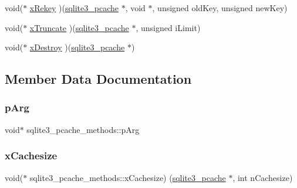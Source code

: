 \begin{DoxyCompactItemize}
void($\ast$ \mbox{\hyperlink{structsqlite3__pcache__methods_a0d8a7a980e22e908429a181f8fc7733e}{x\+Rekey}} )(\mbox{\hyperlink{sqlite3_8h_a096c453d937d51f7926d7d31c8e0bd2f}{sqlite3\+\_\+pcache}} $\ast$, void $\ast$, unsigned old\+Key, unsigned new\+Key)
\item 
void($\ast$ \mbox{\hyperlink{structsqlite3__pcache__methods_adc097defb1e83c6442fc0d47ac79cec9}{x\+Truncate}} )(\mbox{\hyperlink{sqlite3_8h_a096c453d937d51f7926d7d31c8e0bd2f}{sqlite3\+\_\+pcache}} $\ast$, unsigned i\+Limit)
\item 
void($\ast$ \mbox{\hyperlink{structsqlite3__pcache__methods_ac775533f86db1d15bf7e4ded0e037eaf}{x\+Destroy}} )(\mbox{\hyperlink{sqlite3_8h_a096c453d937d51f7926d7d31c8e0bd2f}{sqlite3\+\_\+pcache}} $\ast$)
\end{DoxyCompactItemize}


\subsection{Member Data Documentation}
\mbox{\label{structsqlite3__pcache__methods_ac71a23fce5a94ac9bc6babdbbaf1b5b4}} 
\subsubsection{\texorpdfstring{pArg}{pArg}}
{\footnotesize\ttfamily void$\ast$ sqlite3\+\_\+pcache\+\_\+methods\+::p\+Arg}

\mbox{\label{structsqlite3__pcache__methods_ac9ccbed1bea2a902906bfeaa6a330b40}} 
\subsubsection{\texorpdfstring{xCachesize}{xCachesize}}
{\footnotesize\ttfamily void($\ast$ sqlite3\+\_\+pcache\+\_\+methods\+::x\+Cachesize) (\mbox{\hyperlink{sqlite3_8h_a096c453d937d51f7926d7d31c8e0bd2f}{sqlite3\+\_\+pcache}} $\ast$, int n\+Cachesize)}

\mbox{\label{structsqlite3__pcache__methods_ac903d0438a7a1554c818b4c17585e790}} 
